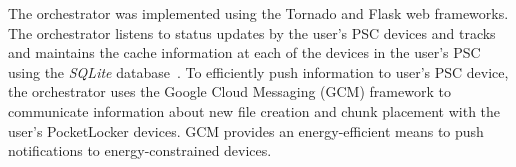 The orchestrator was implemented using the Tornado and Flask web frameworks.
The orchestrator listens to status updates by the user's PSC devices and
tracks and maintains the cache information at each of the devices in the
user's PSC using the \textit{SQLite} database~\cite{sqllite}. To efficiently push information
to user's PSC device, the orchestrator uses the Google Cloud Messaging (GCM)
framework to communicate information about new file creation and chunk placement
with the user's PocketLocker devices. GCM provides an energy-efficient means
to push notifications to energy-constrained devices.

